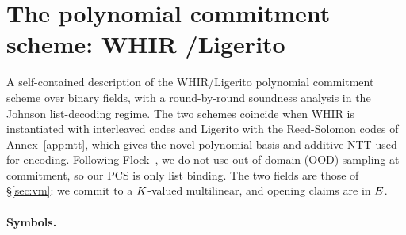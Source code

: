 \section{The polynomial commitment scheme: WHIR \slash Ligerito}\label{annex:pcs}

A self-contained description of the WHIR\slash Ligerito polynomial commitment scheme \cite{ACFY25,NA25} over binary fields, with a round-by-round soundness analysis in the Johnson list-decoding regime. The two schemes coincide when WHIR is instantiated with interleaved codes and Ligerito with the Reed-Solomon codes of Annex~\ref{app:ntt}, which gives the novel polynomial basis and additive NTT used for encoding. Following Flock~\cite{Flock26}, we do not use out-of-domain (OOD) sampling at commitment, so our PCS is only list binding. The two fields are those of \S\ref{sec:vm}: we commit to a $K$-valued multilinear, and opening claims are in $E$.

\paragraph{Symbols.}

